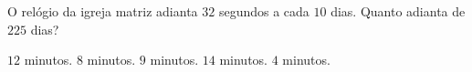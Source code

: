 O relógio da igreja matriz adianta $32$ segundos a cada $10$ dias. Quanto adianta de $225$ dias?

$12$ minutos.
$8$ minutos.
$9$ minutos.
$14$ minutos.
$4$ minutos.



